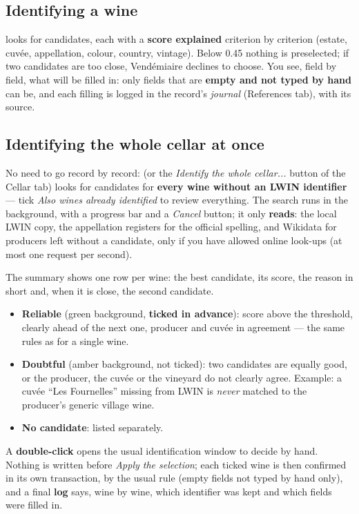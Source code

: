 \documentclass[11pt,a4paper]{article}
\begin{document}
\subsection{Identifying a wine}
 looks for candidates, each with a \textbf{score explained}
criterion by criterion (estate, cuvée, appellation, colour, country, vintage). Below 0.45 nothing is
preselected; if two candidates are too close, Vendémiaire declines to choose. You see, field by field, what
will be filled in: only fields that are \textbf{empty and not typed by hand} can be, and each filling is
logged in the record's \emph{journal} (References tab), with its source.


\subsection{Identifying the whole cellar at once}
No need to go record by record:  (or the \emph{Identify the
whole cellar...} button of the Cellar tab) looks for candidates for \textbf{every wine without an LWIN
identifier} --- tick \emph{Also wines already identified} to review everything. The search runs in the
background, with a progress bar and a \emph{Cancel} button; it only \textbf{reads}: the local LWIN copy,
the appellation registers for the official spelling, and Wikidata for producers left without a candidate,
only if you have allowed online look-ups (at most one request per second).

The summary shows one row per wine: the best candidate, its score, the reason in short and, when it is
close, the second candidate.
\begin{itemize}
  \item \textbf{Reliable} (green background, \textbf{ticked in advance}): score above the threshold, clearly
        ahead of the next one, producer and cuvée in agreement --- the same rules as for a single wine.
  \item \textbf{Doubtful} (amber background, not ticked): two candidates are equally good, or the producer,
        the cuvée or the vineyard do not clearly agree. Example: a cuvée ``Les Fournelles'' missing from
        LWIN is \emph{never} matched to the producer's generic village wine.
  \item \textbf{No candidate}: listed separately.
\end{itemize}
A \textbf{double-click} opens the usual identification window to decide by hand. Nothing is written before
\emph{Apply the selection}; each ticked wine is then confirmed in its own transaction, by the usual rule
(empty fields not typed by hand only), and a final \textbf{log} says, wine by wine, which identifier was kept
and which fields were filled in.
\end{document}
